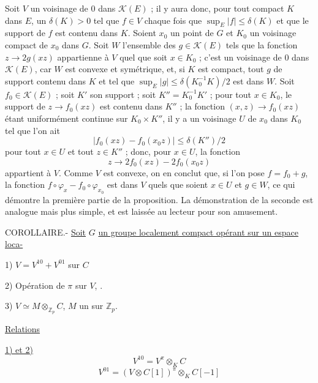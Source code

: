 Soit $V$ un voisinage de $0$ dans $\mathcal K(E)$ ; il y aura donc, pour tout compact $K$ dans $E$, un $\delta(K)>0$ tel que $f\in V$ chaque fois que $\sup_E|f|\le\delta(K)$ et que le support de $f$ est contenu dans $K$. Soient $x_0$ un point de $G$ et $K_0$ un voisinage compact de $x_0$ dans $G$. Soit $W$ l'ensemble des $g\in\mathcal K(E)$ tels que la fonction $z\to 2g(xz)$ appartienne à $V$ quel que soit $x\in K_0$ ; c'est un voisinage de $0$ dans $\mathcal K(E)$, car $W$ est convexe et symétrique, et, si $K$ est compact, tout $g$ de support contenu dans $K$ et tel que $\sup_E|g|\le\delta(K_0^{-1}K)/2$ est dans $W$. Soit $f_0\in\mathcal K(E)$ ; soit $K'$ son support ; soit $K''=K_0^{-1}K'$ ; pour tout $x\in K_0$, le support de $z\to f_0(xz)$ est contenu dans $K''$ ; la fonction $(x,z)\to f_0(xz)$ étant uniformément continue sur $K_0\times K''$, il y a un voisinage $U$ de $x_0$ dans $K_0$ tel que l'on ait
\[
|f_0(xz)-f_0(x_0z)|\le\delta(K'')/2
\]
pour tout $x\in U$ et tout $z\in K''$ ; donc, pour $x\in U$, la fonction
\[
z\to 2f_0(xz)-2f_0(x_0z)
\]
appartient à $V$. Comme $V$ est convexe, on en conclut que, si l'on pose $f=f_0+g$, la fonction $f\circ\varphi_x-f_0\circ\varphi_{x_0}$ est dans $V$ quels que soient $x\in U$ et $g\in W$, ce qui démontre la première partie de la proposition. La démonstration de la seconde est analogue mais plus simple, et est laissée au lecteur pour son amusement.

COROLLAIRE.- \uline{Soit} $G$ \uline{un groupe localement compact opérant sur un espace loca-}




1) $V=V^{10}+V^{01}$  sur $C$


2) Opération de $\pi$ sur $V$, .

3) $V\simeq M\otimes_{\mathbb Z_p}C$, $M$ un   sur $\mathbb Z_p$.

\uline{Relations}

\uline{1) et 2)}
\[
V^{10}=V^\pi\otimes_K C
\]
\[
V^{01}=(V\otimes C[1])^\pi\otimes_K C[-1]
\]

